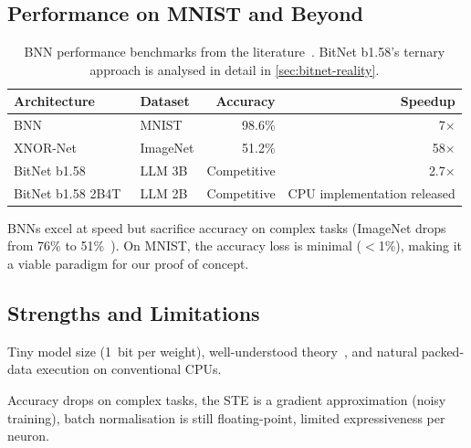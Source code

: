 \subsection{Performance on MNIST and Beyond}
\label{sec:bnn-performance}

\begin{table}[htbp]
\centering
\caption{BNN performance benchmarks from the literature~\cite{courbariaux2016bnn, rastegari2016xnornet, ma2024bitnet, ma2025bitnet2b4t}. BitNet b1.58's ternary approach is analysed in detail in \cref{sec:bitnet-reality}.}
\label{tab:bnn-perf}
\begin{tabular}{@{}llrr@{}}
  \toprule
  \textbf{Architecture} & \textbf{Dataset} & \textbf{Accuracy} & \textbf{Speedup} \\
  \midrule
  BNN~\cite{courbariaux2016bnn} & MNIST   & 98.6\%  & 7$\times$ \\
  XNOR-Net~\cite{rastegari2016xnornet} & ImageNet & 51.2\%  & 58$\times$ \\
  BitNet b1.58~\cite{ma2024bitnet} & LLM 3B  & Competitive & 2.7$\times$ \\
  BitNet b1.58 2B4T~\cite{ma2025bitnet2b4t} & LLM 2B & Competitive & CPU implementation released \\
  \bottomrule
\end{tabular}
\end{table}

BNNs excel at speed but sacrifice accuracy on complex tasks (ImageNet
drops from 76\% to 51\%~\cite{rastegari2016xnornet}). On MNIST, the accuracy loss is minimal
($<$1\%), making it a viable paradigm for our proof of concept.

\subsection{Strengths and Limitations}

\begin{description}[leftmargin=1em]
  \item[Strengths:]
    Tiny model size (1~bit per weight), well-understood
    theory~\cite{bnnsurvey2020}, and natural packed-data execution on
    conventional CPUs.

  \item[Limitations:]
    Accuracy drops on complex tasks, the STE is a gradient approximation
    (noisy training), batch normalisation is still floating-point,
    limited expressiveness per neuron.
\end{description}
